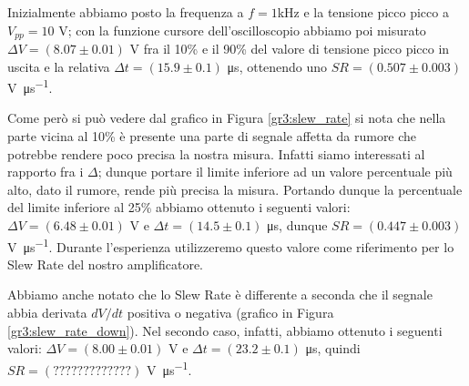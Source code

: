 Inizialmente abbiamo posto la frequenza a $f=1$\si{\kilo\hertz} e la tensione picco picco a $V_{pp}=10$ \si{\volt}; con la funzione cursore dell'oscilloscopio abbiamo poi misurato $\Delta V = (8.07 \pm 0.01)$ \si{\volt} fra il 10\% e il 90\% del valore di tensione picco picco in uscita e la relativa $\Delta t = (15.9 \pm 0.1)$ \si{\micro\second}, ottenendo uno $SR=(0.507 \pm 0.003)$ \si{\volt\per\micro\second}.

Come però si può vedere dal grafico in Figura \ref{gr3:slew_rate} si nota che nella parte vicina al 10\% è presente una parte di segnale affetta da rumore che potrebbe rendere poco precisa la nostra misura. Infatti siamo interessati al rapporto fra i $\Delta$; dunque portare il limite inferiore ad un valore percentuale più alto, dato il rumore, rende più precisa la misura. Portando dunque la percentuale del limite inferiore al 25\% abbiamo ottenuto i seguenti valori: $\Delta V = (6.48 \pm 0.01)$ \si{\volt} e $\Delta t = (14.5 \pm 0.1)$ \si{\micro\second}, dunque $SR = (0.447 \pm 0.003)$ \si{\volt\per\micro\second}. Durante l'esperienza utilizzeremo questo valore come riferimento per lo Slew Rate del nostro amplificatore.

Abbiamo anche notato che lo Slew Rate è differente a seconda che il segnale abbia derivata $dV/dt$ positiva o negativa (grafico in Figura \ref{gr3:slew_rate_down}). Nel secondo caso, infatti, abbiamo ottenuto i seguenti valori: $\Delta V = (8.00 \pm 0.01)$ \si{\volt} e $\Delta t = (23.2 \pm 0.1)$ \si{\micro\second}, quindi $SR = (?????????????)$ \si{\volt\per\micro\second}.

